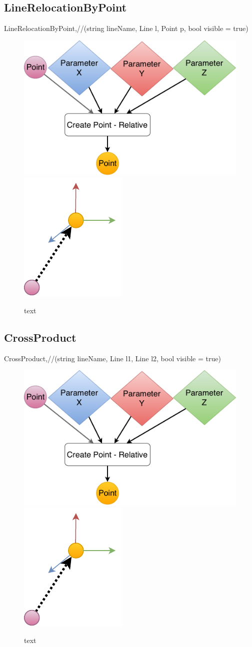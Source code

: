 \subsection{LineRelocationByPoint}
		LineRelocationByPoint,//(string lineName, Line l, Point p, bool visible = true)


\begin{figure}[H]
	\centering
	\includegraphics[height=0.3\textwidth]{obrazky-figures/Diagram/DP Navrh operacii-0D - Point2.pdf}
	\includegraphics[height=0.3\textwidth]{obrazky-figures/Diagram/Draw/1Points/DP Navrh operacii-0D - PointRelative.pdf}
	\caption{text}
	\label{fig:1}
\end{figure}



\subsection{CrossProduct}
		CrossProduct,//(string lineName, Line l1, Line l2, bool visible = true)

\begin{figure}[H]
	\centering
	\includegraphics[height=0.3\textwidth]{obrazky-figures/Diagram/DP Navrh operacii-0D - Point2.pdf}
	\includegraphics[height=0.3\textwidth]{obrazky-figures/Diagram/Draw/1Points/DP Navrh operacii-0D - PointRelative.pdf}
	\caption{text}
	\label{fig:1}
\end{figure}






